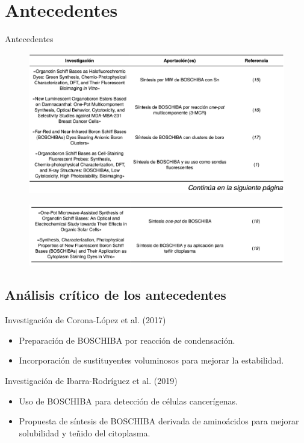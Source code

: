 \documentclass[%
spanish,
mexico]{beamer}
\begin{document}
\section{Antecedentes}
\begin{frame}[allowframebreaks]{Antecedentes}
\begin{figure}
    \includegraphics[width=0.95\linewidth]{./Figuras/t1.png}
\end{figure}
\framebreak
\begin{figure}
    \includegraphics[width=0.95\linewidth]{./Figuras/t2.png}
\end{figure}
\end{frame}

\subsection{Análisis crítico de los antecedentes}

\begin{frame}{Investigación de Corona-López et al. (2017)}
    \begin{itemize}
        \item Preparación de \gls{BOSCHIBA} por reacción de condensación.
        \item Incorporación de sustituyentes voluminosos para mejorar la estabilidad.
    \end{itemize}
\end{frame}

\begin{frame}{Investigación de Ibarra-Rodríguez et al. (2019)}
    \begin{itemize}
        \item Uso de \gls{BOSCHIBA} para detección de células cancerígenas.
        \item Propuesta de síntesis de \gls{BOSCHIBA} derivada de aminoácidos para mejorar solubilidad y teñido del citoplasma.
    \end{itemize}
\end{frame}
\end{document}
